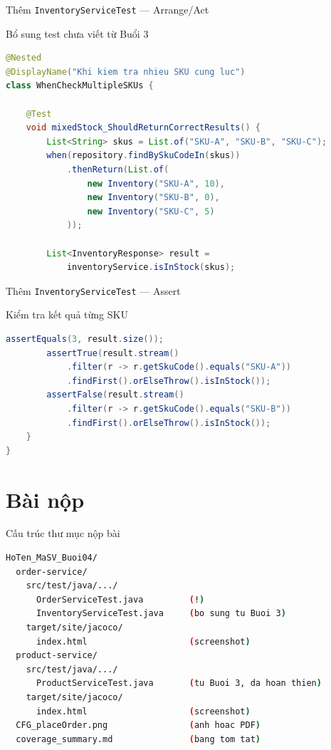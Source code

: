 \documentclass[aspectratio=169,10pt]{beamer}
\begin{document}
\begin{frame}[fragile]{Thêm \texttt{InventoryServiceTest} --- Arrange/Act}
  \begin{block}{Bổ sung test chưa viết từ Buổi 3}
\begin{lstlisting}[language=java]
@Nested
@DisplayName("Khi kiem tra nhieu SKU cung luc")
class WhenCheckMultipleSKUs {

    @Test
    void mixedStock_ShouldReturnCorrectResults() {
        List<String> skus = List.of("SKU-A", "SKU-B", "SKU-C");
        when(repository.findBySkuCodeIn(skus))
            .thenReturn(List.of(
                new Inventory("SKU-A", 10),
                new Inventory("SKU-B", 0),
                new Inventory("SKU-C", 5)
            ));

        List<InventoryResponse> result =
            inventoryService.isInStock(skus);
\end{lstlisting}
  \end{block}
\end{frame}

\begin{frame}[fragile]{Thêm \texttt{InventoryServiceTest} --- Assert}
  \begin{block}{Kiểm tra kết quả từng SKU}
\begin{lstlisting}[language=java]
        assertEquals(3, result.size());
        assertTrue(result.stream()
            .filter(r -> r.getSkuCode().equals("SKU-A"))
            .findFirst().orElseThrow().isInStock());
        assertFalse(result.stream()
            .filter(r -> r.getSkuCode().equals("SKU-B"))
            .findFirst().orElseThrow().isInStock());
    }
}
\end{lstlisting}
  \end{block}
\end{frame}

\section{Bài nộp}

\begin{frame}[fragile]{Cấu trúc thư mục nộp bài}
\begin{lstlisting}[language=bash,style=nonumber]
HoTen_MaSV_Buoi04/
  order-service/
    src/test/java/.../
      OrderServiceTest.java         (!)
      InventoryServiceTest.java     (bo sung tu Buoi 3)
    target/site/jacoco/
      index.html                    (screenshot)
  product-service/
    src/test/java/.../
      ProductServiceTest.java       (tu Buoi 3, da hoan thien)
    target/site/jacoco/
      index.html                    (screenshot)
  CFG_placeOrder.png                (anh hoac PDF)
  coverage_summary.md               (bang tom tat)
\end{lstlisting}
\end{frame}
\end{document}
